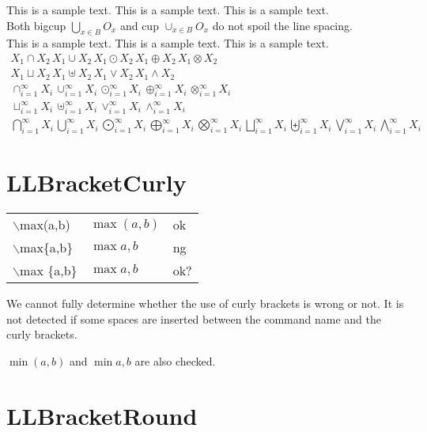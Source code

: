 \documentclass[a4paper, 10pt]{article}
\newcommand{\tA}[1]{\textcolor{cA}{#1}}
\newcommand{\tC}[1]{\textcolor{cC}{#1}}
\newcommand{\tD}[1]{\textcolor{cD}{#1}}
\begin{document}
This is a sample text.
This is a sample text.
This is a sample text.\\
Both
bigcup $\bigcup_{x \in B} O_x$ and
cup $\cup_{x \in B} O_x$ do not spoil the line spacing.\\
This is a sample text.
This is a sample text.
This is a sample text.
\begin{gather*}
	X_1 \cap X_2 \,
	X_1 \cup X_2 \,
	X_1 \odot X_2 \,
	X_1 \oplus X_2 \,
	X_1 \otimes X_2 \\
	X_1 \sqcup X_2\,
	X_1 \uplus X_2 \,
	X_1 \vee X_2 \,
	X_1 \wedge X_2 \\
	\cap_{i=1}^{\infty} X_i \,
	\cup_{i=1}^{\infty} X_i \,
	\odot_{i=1}^{\infty} X_i \,
	\oplus_{i=1}^{\infty} X_i \,
	\otimes_{i=1}^{\infty} X_i \\
	\sqcup_{i=1}^{\infty} X_i \,
	\uplus_{i=1}^{\infty} X_i \,
	\vee_{i=1}^{\infty} X_i \,
	\wedge_{i=1}^{\infty} X_i \\
	\bigcap_{i=1}^{\infty} X_i \,
	\bigcup_{i=1}^{\infty} X_i \,
	\bigodot_{i=1}^{\infty} X_i \,
	\bigoplus_{i=1}^{\infty} X_i \,
	\bigotimes_{i=1}^{\infty} X_i \,
	\bigsqcup_{i=1}^{\infty} X_i \,
	\biguplus_{i=1}^{\infty} X_i \,
	\bigvee_{i=1}^{\infty} X_i \,
	\bigwedge_{i=1}^{\infty} X_i
\end{gather*}

\section{LLBracketCurly}

\begin{table}[h]
	\centering
	\begin{tabular}{lll}
		$\backslash$max(a,b)    & $\max(a,b)$  & \tA{ok}  \\
		$\backslash$max\{a,b\}  & $\max{a,b}$  & \tD{ng}  \\
		$\backslash$max \{a,b\} & $\max {a,b}$ & \tC{ok?}
	\end{tabular}
\end{table}

We cannot fully determine whether the use of curly brackets is wrong or not.
It is not detected if some spaces are inserted between the command name and the curly brackets.

$\min(a,b)$ and $\min{a,b}$ are also checked.

\section{LLBracketRound}
\end{document}
